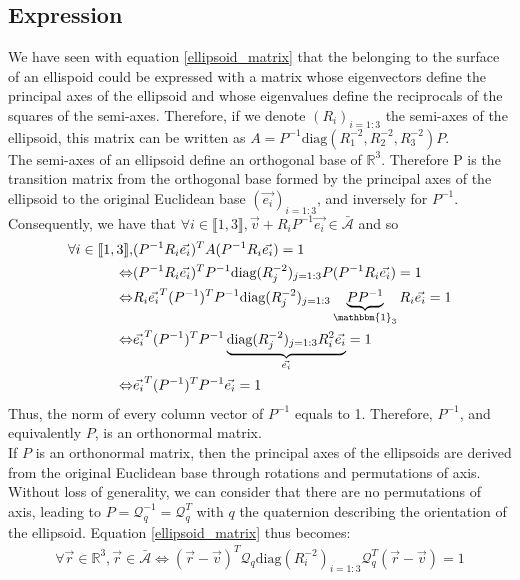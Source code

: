 \documentclass[class=report, float=false, crop=false]{standalone}
\begin{document}
\subsection{Expression}
\label{belonging_exp}

We have seen with equation \ref{ellipsoid_matrix} that the belonging to the surface of an ellispoid could be expressed with a matrix whose eigenvectors define the principal axes of the ellipsoid and whose eigenvalues define the reciprocals of the squares of the semi-axes. Therefore, if we denote $(R_i)_{i=1:3}$ the semi-axes of the ellipsoid, this matrix can be written as $A = P^{-1}\text{diag}(R_1^{-2},R_2^{-2},R_3^{-2})P$.\\

The semi-axes of an ellipsoid define an orthogonal base of $\mathbb{R}^3$. Therefore P is the transition matrix from the orthogonal base formed by the principal axes of the ellipsoid to the original Euclidean base $(\vec{e_i})_{i=1:3}$, and inversely for $P^{-1}$.\\

Consequently, we have that $\forall i \in \llbracket1,3\rrbracket, \vec{v} + R_iP^{-1}\vec{e_i} \in \bar{\mathcal{A}}$ and so
\begin{align*}
\forall i \in \llbracket1,3\rrbracket,&(P^{-1}R_i\vec{e_i})^TA(P^{-1}R_i\vec{e_i}) = 1\\ \Leftrightarrow&(P^{-1}R_i\vec{e_i})^TP^{-1}\text{diag}(R_j^{-2})_{j=1:3}P(P^{-1}R_i\vec{e_i}) = 1\\
\Leftrightarrow &R_i\vec{e_i}^T(P^{-1})^TP^{-1}\text{diag}(R_j^{-2})_{j=1:3}\underbrace{PP^{-1}}_{\mathbbm{1}_3}R_i\vec{e_i} = 1\\
\Leftrightarrow &\vec{e_i}^T(P^{-1})^TP^{-1}\underbrace{\text{diag}(R_j^{-2})_{j=1:3}R_i^2\vec{e_i}}_{\vec{e_i}} = 1\\
\Leftrightarrow &\vec{e_i}^T(P^{-1})^TP^{-1}\vec{e_i} = 1
\end{align*}
Thus, the norm of every column vector of $P^{-1}$ equals to 1. Therefore, $P^{-1}$, and equivalently $P$, is an orthonormal matrix.\\

If $P$ is an orthonormal matrix, then the principal axes of the ellipsoids are derived from the original Euclidean base through rotations and permutations of axis. Without loss of generality, we can consider that there are no permutations of axis, leading to $P = \mathcal{Q}_q^{-1} = \mathcal{Q}_q^T$ with $q$ the quaternion describing the orientation of the ellipsoid. Equation \ref{ellipsoid_matrix} thus becomes:
\begin{align*}
\forall \vec{r} \in \mathbb{R}^3, \vec{r} \in \bar{\mathcal{A}} \Leftrightarrow (\vec{r}-\vec{v})^T\mathcal{Q}_q\text{diag}(R_i^{-2})_{i=1:3}\mathcal{Q}_q^T(\vec{r}-\vec{v}) = 1
\end{align*}
\end{document}

